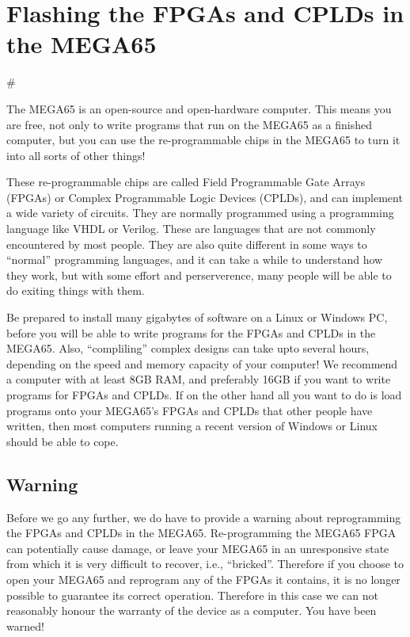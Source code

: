 \chapter{Flashing the FPGAs and CPLDs in the MEGA65}
#

The MEGA65 is an open-source and open-hardware computer. This means you are free,
not only to write programs that run on the MEGA65 as a finished computer, but you can
use the re-programmable chips in the MEGA65 to turn it into all sorts of other things!

These re-programmable chips are called Field Programmable Gate Arrays (FPGAs) or
Complex Programmable Logic Devices (CPLDs), and can implement a wide variety of circuits.
They are normally programmed using a programming language like VHDL or Verilog.  These
are languages that are not commonly encountered by most people.  They are also quite
different in some ways to ``normal'' programming languages, and it can take a while to
understand how they work, but with some effort and perserverence, many people will be
able to do exiting things with them.

Be prepared to install many gigabytes of software on a Linux or Windows PC, before you will
be able to write programs for the FPGAs and CPLDs in the MEGA65.  Also, ``compliling'' complex
designs can take upto several hours, depending on the speed and memory capacity of your computer!
We recommend a computer with at least 8GB RAM, and preferably 16GB if you want to write
programs for FPGAs and CPLDs. If on the other hand all you want to do is load programs onto
your MEGA65's FPGAs and CPLDs that other people have written, then most computers running a recent
version of Windows or Linux should be able to cope.

\section{Warning}

Before we go any further, we do have to provide a warning about reprogramming the FPGAs and
CPLDs in the MEGA65.
Re-programming the MEGA65 FPGA can potentially cause
damage, or leave your MEGA65 in an unresponsive state from which it is very difficult to
recover, i.e., ``bricked''.  Therefore if you choose to open your MEGA65 and reprogram
any of the FPGAs it contains, it is no longer possible to guarantee its correct operation.
Therefore in this case we can not reasonably honour the warranty of the device as a computer.
You have been warned!

